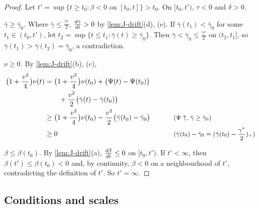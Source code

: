 \begin{proof}
Let $t'=\sup\{t\ge t_0:\beta<0\text{ on }[t_0,t]\}>t_0$. On $[t_0,t')$, $\tau<0$ and $\delta>0$.

\emph{$\bar\gamma\ge \bar\gamma_0$.} Where $\bar\gamma\le\frac{\gamma^\star}{2}$, $\ddt{\bar\gamma}>0$ by \cref{lem:J-drift}(d), (e). If $\bar\gamma(t_1)<\bar\gamma_0$ for some $t_1\in(t_0,t')$, let
$t_2=\sup\{t\le t_1:\bar\gamma(t)\ge \bar\gamma_0\}$. Then $\bar\gamma<\bar\gamma_0\le\frac{\gamma^\star}{2}$ on $(t_2,t_1]$, so $\bar\gamma(t_1)>\bar\gamma(t_2)=\bar\gamma_0$, a contradiction.

\emph{$\nu\ge0$.} By \cref{lem:J-drift}(b), (c),
\begin{alignat*}{2}
 \bigl(1+\tfrac{v^2}{4}\bigr)\nu(t)&=\bigl(1+\tfrac{v^2}{4}\bigr)\nu(t_0)+\bigl(\Psi(t)-\Psi(t_0)\bigr) &\qquad&\\
 &\qquad+\tfrac{v^2}{2}\bigl(\bar\gamma(t)-\bar\gamma(t_0)\bigr)\\
 &\ge\bigl(1+\tfrac{v^2}{4}\bigr)\nu(t_0)-\tfrac{v^2}{2}\bigl(\bar\gamma(t_0)-\bar\gamma_0\bigr) && \why{$\Psi\uparrow$, $\bar\gamma\ge \bar\gamma_0$}\\
 &\ge0 && \why{$\bar\gamma(t_0)-\bar\gamma_0=(\bar\gamma(t_0)-\tfrac{\gamma^\star}{2})_+$}
\end{alignat*}

\emph{$\beta\le \beta(t_0)$.} By \cref{lem:J-drift}(a), $\ddt{\beta}\le0$ on $[t_0,t')$. If $t'<\infty$, then $\beta(t')\le \beta(t_0)<0$ and, by continuity, $\beta<0$ on a
neighbourhood of $t'$, contradicting the definition of $t'$. So $t'=\infty$.
\end{proof}

\subsection{Conditions and scales}
\label{app:J-constants}

